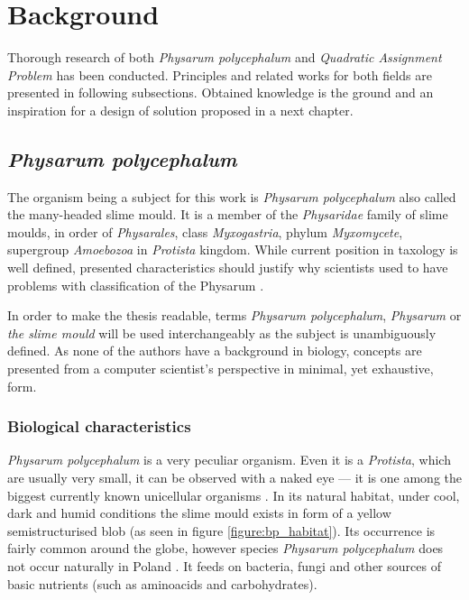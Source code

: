 \documentclass[english,a4paper,twoside]{ppfcmthesis}
\begin{document}
\chapter{Background}
\label{chapter:background}

Thorough research of both \textit{Physarum polycephalum} and \textit{Quadratic Assignment Problem} has been conducted. Principles and related works for both fields are presented in following subsections. Obtained knowledge is the ground and an inspiration for a design of solution proposed in a next chapter.


\section{\textit{Physarum polycephalum}}
\label{section:background_physarum}

The organism being a subject for this work is \textit{Physarum polycephalum} also called the many-headed slime mould. It is a member of the \textit{Physaridae} family of slime moulds, in order of \textit{Physarales}, class \textit{Myxogastria}, phylum \textit{Myxomycete}, supergroup \textit{Amoebozoa} in \textit{Protista} kingdom. While current position in taxology is well defined, presented characteristics should justify why scientists used to have problems with classification of the Physarum \cite{stephenson1994myxomycetes}.

In order to make the thesis readable, terms \textit{Physarum polycephalum}, \textit{Physarum} or \textit{the slime mould} will be used interchangeably as the subject is unambiguously defined. As none of the authors have a background in biology, concepts are presented from a computer scientist's perspective in minimal, yet exhaustive, form.


\subsection{Biological characteristics}

\textit{Physarum polycephalum} is a very peculiar organism. Even it is a \textit{Protista}, which are usually very small, it can be observed with a naked eye --- it is one among the biggest currently known unicellular organisms \cite{stephenson1994myxomycetes}. In its natural habitat, under cool, dark and humid conditions the slime mould exists in form of a yellow semistructurised blob (as seen in figure \ref{figure:bp_habitat}). Its occurrence is fairly common around the globe, however species \textit{Physarum polycephalum} does not occur naturally in Poland \cite{narkiewicz2013grzyby}. It feeds on bacteria, fungi and other sources of basic nutrients (such as aminoacids and carbohydrates).
\end{document}
